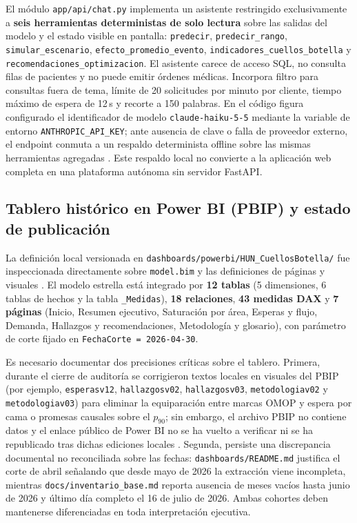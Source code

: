 El módulo \texttt{app/api/chat.py} implementa un asistente restringido exclusivamente a \textbf{seis herramientas deterministas de solo lectura} sobre las salidas del modelo y el estado visible en pantalla: \texttt{predecir}, \texttt{predecir\_rango}, \texttt{simular\_escenario}, \texttt{efecto\_promedio\_evento}, \texttt{indicadores\_cuellos\_botella} y \texttt{recomendaciones\_optimizacion}. El asistente carece de acceso SQL, no consulta filas de pacientes y no puede emitir órdenes médicas. Incorpora filtro para consultas fuera de tema, límite de 20 solicitudes por minuto por cliente, tiempo máximo de espera de 12\,s y recorte a 150 palabras. En el código figura configurado el identificador de modelo \texttt{claude-haiku-5-5} mediante la variable de entorno \texttt{ANTHROPIC\_API\_KEY}; ante ausencia de clave o falla de proveedor externo, el endpoint conmuta a un respaldo determinista offline sobre las mismas herramientas agregadas \parencite{mediflow2026informe}. Este respaldo local no convierte a la aplicación web completa en una plataforma autónoma sin servidor FastAPI.

\subsection{Tablero histórico en Power BI (PBIP) y estado de publicación}

La definición local versionada en \texttt{dashboards/powerbi/HUN\_CuellosBotella/} fue inspeccionada directamente sobre \texttt{model.bim} y las definiciones de páginas y visuales \parencite{mediflow2026pbip}. El modelo estrella está integrado por \textbf{12 tablas} (5 dimensiones, 6 tablas de hechos y la tabla \texttt{\_Medidas}), \textbf{18 relaciones}, \textbf{43 medidas DAX} y \textbf{7 páginas} (Inicio, Resumen ejecutivo, Saturación por área, Esperas y flujo, Demanda, Hallazgos y recomendaciones, Metodología y glosario), con parámetro de corte fijado en \texttt{FechaCorte = 2026-04-30}.

Es necesario documentar dos precisiones críticas sobre el tablero. Primera, durante el cierre de auditoría se corrigieron textos locales en visuales del PBIP (por ejemplo, \texttt{esperasv12}, \texttt{hallazgosv02}, \texttt{hallazgosv03}, \texttt{metodologiav02} y \texttt{metodologiav03}) para eliminar la equiparación entre marcas OMOP y espera por cama o promesas causales sobre el $p_{90}$; sin embargo, el archivo PBIP no contiene datos y el enlace público de Power BI no se ha vuelto a verificar ni se ha republicado tras dichas ediciones locales \parencite{mediflow2026auditoria}. Segunda, persiste una discrepancia documental no reconciliada sobre las fechas: \texttt{dashboards/README.md} justifica el corte de abril señalando que desde mayo de 2026 la extracción viene incompleta, mientras \texttt{docs/inventario\_base.md} reporta ausencia de meses vacíos hasta junio de 2026 y último día completo el 16 de julio de 2026. Ambas cohortes deben mantenerse diferenciadas en toda interpretación ejecutiva.

